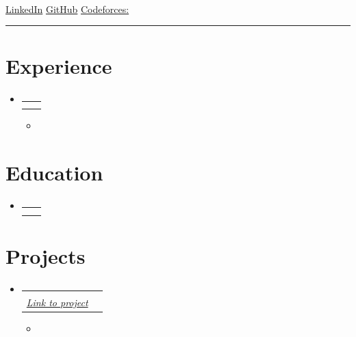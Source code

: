 \documentclass[a4paper,20pt]{article}
\makeatletter
\newcommand{\resumeSubheading}[4]{
  \vspace{-1pt}\item
    \begin{tabular*}{0.97\textwidth}{l@{\extracolsep{\fill}}r}
      \textbf{#1} & #2 \\
      \textit{#3} & \textit{#4} \\
    \end{tabular*}\vspace{-5pt}
}
\newcommand{\resumeSubHeadingListStart}{\begin{itemize}[leftmargin=*]}
\newcommand{\resumeSubHeadingListEnd}{\end{itemize}}
\makeatother
\begin{document}
\begin{center}
    {\LARGE \textbf{}}\\
    \vspace{3pt}
    \href{mailto:\VAR{contact.email}}{}
\hspace{0.6em}\textbar\hspace{0.6em}
\hspace{0.6em}\textbar\hspace{0.6em}
\href{\VAR{contact.linkedin}}{LinkedIn}
\hspace{0.6em}\textbar\hspace{0.6em}
\href{\VAR{contact.github}}{GitHub}
\hspace{0.6em}\textbar\hspace{0.6em}
\href{\VAR{contact.codeforces}}{Codeforces: }
\end{center}
\vspace{-12pt}
\noindent\rule{\textwidth}{0.5pt}

\noindent


\section{Experience}
  \resumeSubHeadingListStart
{}
    \resumeSubheading
      {\VAR{role.title}}{\VAR{role.location}}
      {\VAR{role.org}}{\VAR{role.dates}}
      \begin{itemize}
        \item {}
      \end{itemize}
    \vspace{-3pt}
  \resumeSubHeadingListEnd

\section{Education}
  \resumeSubHeadingListStart
{}
    \resumeSubheading
      {\VAR{school.institution}}{\VAR{school.location}}
      {\VAR{school.degree}}{\VAR{school.dates}}
  \resumeSubHeadingListEnd
  \vspace{-5pt}

\section{Projects}
  \resumeSubHeadingListStart
{}
    \resumeSubheading
      {\VAR{project.title}}{\textit{}}
      {\href{\VAR{project.link}}{Link to project}}{\VAR{project.date}}
       \vspace{-9pt}
      \begin{itemize}
        \item {}
      \end{itemize}
  \resumeSubHeadingListEnd
{}
\end{document}
